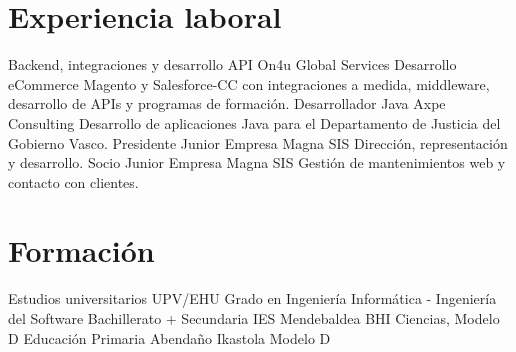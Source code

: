 \documentclass[letterpaper]{twentysecondcv_es} %
\begin{document}

\section{Experiencia laboral}

\begin{twenty} %
	    {Backend, integraciones y desarrollo API}
    	{On4u Global Services}
    	{Desarrollo eCommerce Magento y Salesforce-CC con integraciones a medida, middleware, desarrollo de APIs y programas de formación.}
	    {Desarrollador Java}
    	{Axpe Consulting}
    	{Desarrollo de aplicaciones Java para el Departamento de Justicia del Gobierno Vasco.}
	    {Presidente}
    	{Junior Empresa Magna SIS}
    	{Dirección, representación y desarrollo.}
	    {Socio}
    	{Junior Empresa Magna SIS} 
    	{Gestión de mantenimientos web y contacto con clientes.}
\end{twenty}


\section{Formación}

\begin{twenty} %
	{Estudios universitarios}
	{UPV/EHU}
	{Grado en Ingeniería Informática - Ingeniería del Software}
	{Bachillerato + Secundaria}
	{IES Mendebaldea BHI}
	{Ciencias, Modelo D}
	{Educación Primaria}
	{Abenda\~no Ikastola}
	{Modelo D}
\end{twenty}
\end{document}
